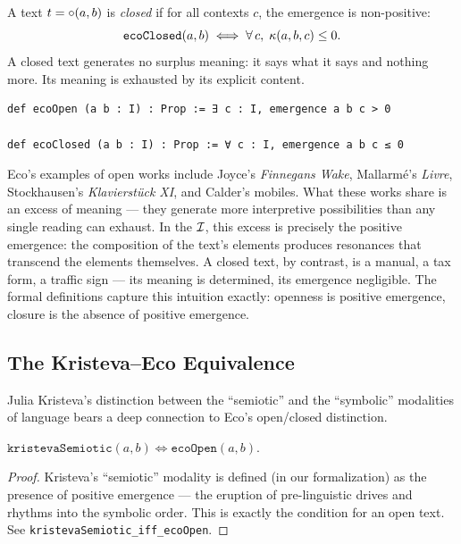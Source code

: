 \begin{definition}
\label{def:eco-closed}
A text $t = \circ(a, b)$ is \emph{closed} if for all contexts $c$,
the emergence is non-positive:
\[
  \texttt{ecoClosed}(a, b) \iff \forall\, c,\;
  \kappa(a, b, c) \leq 0.
\]
A closed text generates no surplus meaning: it says what it says and
nothing more. Its meaning is exhausted by its explicit content.
\end{definition}

\begin{lstlisting}[caption={Open and closed texts in the IdeaticSpace}]
def ecoOpen (a b : I) : Prop := ∃ c : I, emergence a b c > 0

def ecoClosed (a b : I) : Prop := ∀ c : I, emergence a b c ≤ 0
\end{lstlisting}

\begin{interpretation}
Eco's examples of open works include Joyce's \textit{Finnegans Wake},
Mallarm\'e's \textit{Livre}, Stockhausen's \textit{Klavierst\"uck XI},
and Calder's mobiles. What these works share is an excess of meaning
--- they generate more interpretive possibilities than any single
reading can exhaust. In the $\mathcal{I}$, this excess is precisely the
positive emergence: the composition of the text's elements produces
resonances that transcend the elements themselves. A closed text, by
contrast, is a manual, a tax form, a traffic sign --- its meaning
is determined, its emergence negligible. The formal definitions capture
this intuition exactly: openness is positive emergence, closure is
the absence of positive emergence.
\end{interpretation}

\subsection{The Kristeva--Eco Equivalence}

Julia Kristeva's distinction between the ``semiotic'' and the
``symbolic'' modalities of language bears a deep connection to Eco's
open/closed distinction.

\begin{theorem}
\label{thm:kristeva-eco}
$\texttt{kristevaSemiotic}(a, b) \iff \texttt{ecoOpen}(a, b)$.
\end{theorem}

\begin{proof}
Kristeva's ``semiotic'' modality is defined (in our formalization) as
the presence of positive emergence --- the eruption of pre-linguistic
drives and rhythms into the symbolic order. This is exactly the
condition for an open text. See
\texttt{kristevaSemiotic\_iff\_ecoOpen}.
\end{proof}

